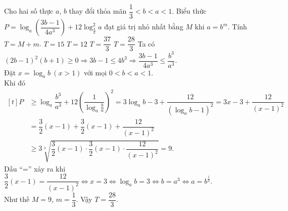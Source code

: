 \begin{ex}%
 Cho hai số thực $a$, $b$ thay đổi thỏa mãn $\dfrac{1}{3}<b<a<1$. Biểu thức $P=\log_a\left(\dfrac{3b-1}{4a^3}\right)+12\log_{\frac{b}{a}}^2a$ đạt giá trị nhỏ nhất bằng $M$ khi $a=b^m$. Tính $T=M+m$.
 \choice
  {$T=15$}
  {$T=12$}
  {$T=\dfrac{37}{3}$}
  {\True $T=\dfrac{28}{3}$}
 \loigiai
  {
  Ta có $\left(2b-1\right)^2\left(b+1\right)\ge 0\Rightarrow 3b-1\le 4b^3\Rightarrow \dfrac{3b-1}{4a^3}\le \dfrac{b^3}{a^3}$.\\
  Đặt $x=\log_ab \ (x>1)$ với mọi $0<b<a<1$.\\
  Khi đó $ \begin{aligned}[t]
  P&\ge \log_a\dfrac{b^3}{a^3}+12\left(\dfrac{1}{\log_a\frac{b}{a}}\right)^2=3\log_ab-3+\dfrac{12}{\left(\log_ab-1\right)^2}=3x-3+\dfrac{12}{(x-1)^2}\\
  & =\dfrac{3}{2}\left(x-1\right)+\dfrac{3}{2}\left(x-1\right)+\dfrac{12}{(x-1)^2}\\
  & \ge 3\sqrt[3]{\dfrac{3}{2}(x-1)\cdot \dfrac{3}{2}(x-1) \cdot \dfrac{12}{(x-1)^2}}=9.
  \end{aligned} $	\\
  Dấu ``='' xảy ra khi $\dfrac{3}{2}\left(x-1\right)=\dfrac{12}{{\left(x-1\right)}^2}\Leftrightarrow x=3\Leftrightarrow \log_ab=3\Leftrightarrow b=a^3\Leftrightarrow a=b^{\tfrac{1}{3}}$.\\
  Như thế $M=9$, $m=\dfrac{1}{3}$. Vậy $T=\dfrac{28}{3}$.}
\end{ex}


